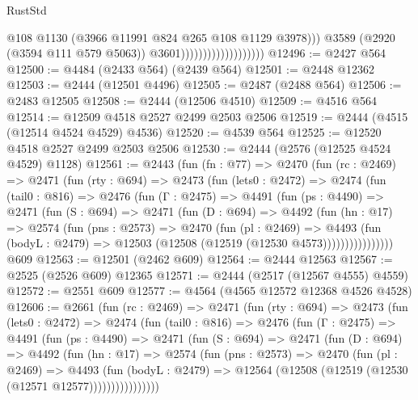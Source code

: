 \begin{lexlean}{RustStd}
\begin{coremodule}
                                              @108
                                              @1130
                                              (@3966 @11991 @824 @265 @108 @1129 @3978)))
                                          @3589
                                          (@2920 (@3594 @111 @579 @5063))
                                          @3601)))))))))))))))))))
@12496 := @2427 @564
@12500 := @4484 (@2433 @564) (@2439 @564)
@12501 := @2448 @12362
@12503 := @2444 (@12501 @4496)
@12505 := @2487 (@2488 @564)
@12506 := @2483 @12505
@12508 := @2444 (@12506 @4510)
@12509 := @4516 @564
@12514 := @12509 @4518 @2527 @2499 @2503 @2506
@12519 := @2444 (@4515 (@12514 @4524 @4529) @4536)
@12520 := @4539 @564
@12525 := @12520 @4518 @2527 @2499 @2503 @2506
@12530 := @2444 (@2576 (@12525 @4524 @4529) @1128)
@12561 := @2443
    (fun (fn : @77) =>
    @2470
      (fun (rc : @2469) =>
      @2471
        (fun (rty : @694) =>
        @2473
          (fun (lets0 : @2472) =>
          @2474
            (fun (tail0 : @816) =>
            @2476
              (fun (Γ : @2475) =>
              @4491
                (fun (ps : @4490) =>
                @2471
                  (fun (S : @694) =>
                  @2471
                    (fun (D : @694) =>
                    @4492
                      (fun (hn : @17) =>
                      @2574
                        (fun (pns : @2573) =>
                        @2470
                          (fun (pl : @2469) =>
                          @4493
                            (fun (bodyL : @2479) =>
                            @12503 (@12508 (@12519 (@12530 @4573))))))))))))))))
    @609
@12563 := @12501 (@2462 @609)
@12564 := @2444 @12563
@12567 := @2525 (@2526 @609) @12365
@12571 := @2444 (@2517 (@12567 @4555) @4559)
@12572 := @2551 @609
@12577 := @4564 (@4565 @12572 @12368 @4526 @4528)
@12606 := @2661
    (fun (rc : @2469) =>
    @2471
      (fun (rty : @694) =>
      @2473
        (fun (lets0 : @2472) =>
        @2474
          (fun (tail0 : @816) =>
          @2476
            (fun (Γ : @2475) =>
            @4491
              (fun (ps : @4490) =>
              @2471
                (fun (S : @694) =>
                @2471
                  (fun (D : @694) =>
                  @4492
                    (fun (hn : @17) =>
                    @2574
                      (fun (pns : @2573) =>
                      @2470
                        (fun (pl : @2469) =>
                        @4493
                          (fun (bodyL : @2479) =>
                          @12564 (@12508 (@12519 (@12530 (@12571 @12577))))))))))))))))

\end{coremodule}
\end{lexlean}
